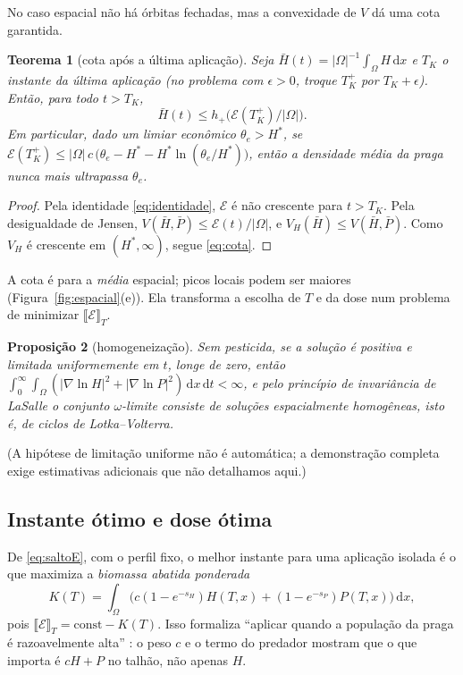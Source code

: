 \documentclass[11pt,a4paper]{article}
\numberwithin{equation}{section}
\newtheorem{teorema}{Teorema}[section]
\newtheorem{proposicao}[teorema]{Proposição}
\theoremstyle{definition}
\theoremstyle{remark}
\newcommand{\E}{\mathcal{E}}
\newcommand{\jump}[1]{\llbracket #1 \rrbracket}
\newcommand{\dd}{\,\mathrm{d}}
\newcommand{\Hs}{H^{*}}
\begin{document}
No caso espacial não há órbitas fechadas, mas a convexidade de $V$ dá uma cota garantida.

\begin{teorema}[cota após a última aplicação]\label{teo:cota}
Seja $\bar H(t)=|\Omega|^{-1}\int_\Omega H\dd x$ e $T_K$ o instante da última aplicação
(no problema com $\epsilon>0$, troque $T_K^+$ por $T_K+\epsilon$). Então, para todo $t>T_K$,
\begin{equation}\label{eq:cota}
\bar H(t)\le h_+\big(\E(T_K^+)/|\Omega|\big).
\end{equation}
Em particular, dado um limiar econômico $\theta_e>\Hs$, se
$\E(T_K^+)\le|\Omega|\,c\,\big(\theta_e-\Hs-\Hs\ln(\theta_e/\Hs)\big)$, então a densidade média da
praga nunca mais ultrapassa $\theta_e$.
\end{teorema}

\begin{proof}
Pela identidade \eqref{eq:identidade}, $\E$ é não crescente para $t>T_K$. Pela desigualdade de
Jensen, $V(\bar H,\bar P)\le\E(t)/|\Omega|$, e $V_H(\bar H)\le V(\bar H,\bar P)$. Como $V_H$ é
crescente em $(\Hs,\infty)$, segue \eqref{eq:cota}.
\end{proof}

A cota é para a \emph{média} espacial; picos locais podem ser maiores (Figura~\ref{fig:espacial}(e)).
Ela transforma a escolha de $T$ e da dose num problema de minimizar $\jump{\E}_T$.

\begin{proposicao}[homogeneização]
Sem pesticida, se a solução é positiva e limitada uniformemente em $t$, longe de zero, então
$\int_0^\infty\!\!\int_\Omega(|\nabla\ln H|^2+|\nabla\ln P|^2)\dd x\dd t<\infty$, e pelo princípio
de invariância de LaSalle \cite{Hale} o conjunto $\omega$-limite consiste de soluções
espacialmente homogêneas, isto é, de ciclos de Lotka--Volterra.
\end{proposicao}
\noindent(A hipótese de limitação uniforme não é automática; a demonstração completa exige
estimativas adicionais que não detalhamos aqui.)

\subsection{Instante ótimo e dose ótima}

De \eqref{eq:saltoE}, com o perfil fixo, o melhor instante para uma aplicação isolada é o que
maximiza a \emph{biomassa abatida ponderada}
\[
K(T)=\int_\Omega\Big(c(1-e^{-s_H})H(T,x)+(1-e^{-s_P})P(T,x)\Big)\dd x,
\]
pois $\jump{\E}_T=\text{const}-K(T)$. Isso formaliza ``aplicar quando a população da praga é
razoavelmente alta'' \cite{LiYang}: o peso $c$ e o termo do predador mostram que o que importa é
$cH+P$ no talhão, não apenas $H$.
\end{document}
